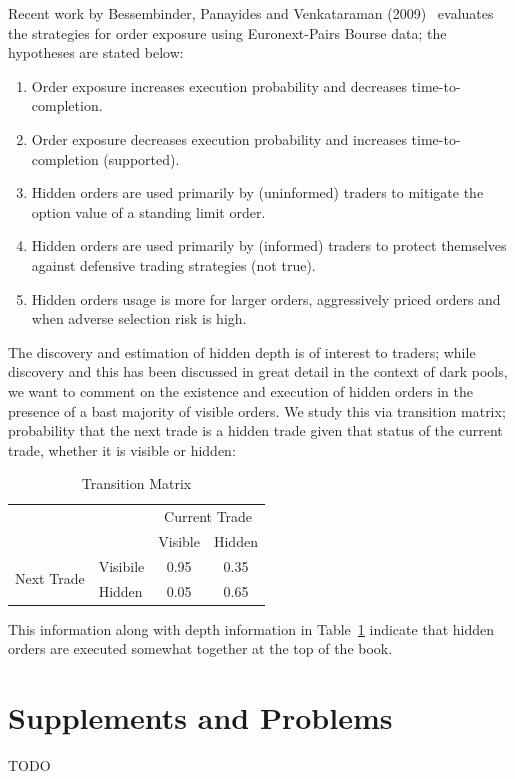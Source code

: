 Recent work by Bessembinder, Panayides and Venkataraman (2009)~\cite{bessenbinder} evaluates the strategies for order exposure using Euronext-Pairs Bourse data; the hypotheses are stated below:
\begin{enumerate}[--]
\item Order exposure increases execution probability and decreases time-to-completion.
\item Order exposure decreases execution probability and increases time-to-completion (supported).
\item Hidden orders are used primarily by (uninformed) traders to mitigate the option value of a standing limit order.
\item Hidden orders are used primarily by (informed) traders to protect themselves against defensive trading strategies (not true).
\item Hidden orders usage is more for larger orders, aggressively priced orders and when adverse selection risk is high.
\end{enumerate}
The discovery and estimation of hidden depth is of interest to traders; while discovery and this has been discussed in great detail in the context of dark pools, we want to comment on the existence and execution of hidden orders in the presence of a bast majority of visible orders. We study this via transition matrix; probability that the next trade is a hidden trade given that status of the current trade, whether it is visible or hidden:
	\begin{table}[!ht]
	\centering
	\caption{Transition Matrix \label{tab:transmatrix}}
	\begin{tabular}{c l | cc}
	& & \multicolumn{2}{c}{Current Trade} \\
	& & Visible & Hidden \\ \hline
	\multirow{2}{*}{Next Trade} & Visibile & 0.95 & 0.35 \\
	& Hidden & 0.05 & 0.65
	\end{tabular}
	\end{table}
This information along with depth information in Table~\ref{tab:transmatrix} indicate that hidden orders are executed somewhat together at the top of the book. 







\section{Supplements and Problems} 
TODO

